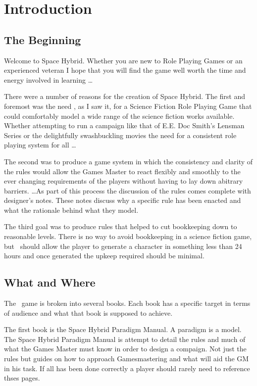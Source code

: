 \chapter{Introduction}

\section{The Beginning}

Welcome to Space Hybrid. Whether you are new to Role Playing Games 
or an experienced veteran I hope that you will find the game well
worth the time and energy involved in learning \dots

There were a number of reasons for the creation of Space Hybrid. The 
first and foremost was the need , as I saw it, for a Science 
Fiction Role Playing Game that could comfortably model a wide range
of the science fiction works available. Whether attempting to run 
a campaign like that of E.E. Doc Smith's Lensman Series or the 
delightfully swashbuckling  movies the need for a consistent
role playing system for all \dots

The second was to produce a game system in which the consistency 
and clarity of the rules would allow the Games Master to 
react flexibly and smoothly to the ever changing requirements
of the players without having to lay down abitrary barriers.
\dots As part of this process the discussion of the rules comes 
complete with designer's notes. These notes discuss why a 
specific rule has been enacted and what the rationale behind 
what they model. 

The third goal was to produce rules that helped to cut
bookkeeping down to reasonable levels. There is no way to avoid 
bookkeeping in a science fiction game, but \SH\ should 
allow the player to generate a character in something less than 24 
hours and once generated the upkeep required should be minimal.


\section{What and Where}
The \SH\ game is broken into several books. Each book has
a specific target in terms of audience and what that book is supposed 
to achieve.

The first book is the Space Hybrid Paradigm Manual. A paradigm is a model.
The Space Hybrid Paradigm Manual is attempt to detail the rules and 
much of what the Games Master must know in order to design a compaign. 
Not just the rules but guides on how to approach Gamesmastering and what will aid the 
GM in his task. If all has been done correctly a player should rarely need to reference 
thses pages.

